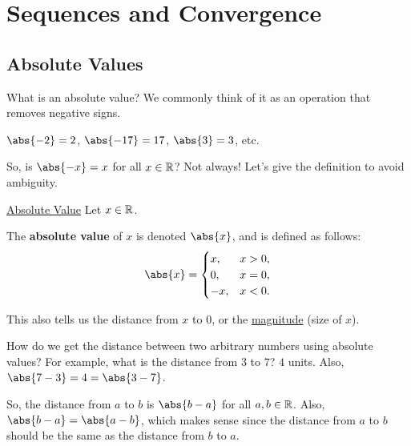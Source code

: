 \chapter{Sequences and Convergence}
\section{Absolute Values}
What is an absolute value? We commonly think of it as an operation that removes negative signs.
\begin{Example}{}{}
    $ \abs{-2}=2 $, $ \abs{-17}=17 $, $ \abs{3}=3 $, etc.
\end{Example}
So, is $ \abs{-x}=x $ for all $ x\in\mathbb{R}$? Not always! Let's give the definition to avoid ambiguity.
\begin{Definition}{\href{https://proofwiki.org/wiki/Definition:Absolute_Value/Definition_1}{Absolute Value}}{}
    Let $ x\in\mathbb{R} $.\bigskip

    The \textbf{absolute value} of $ x $ is denoted $ \abs{x} $,
    and is defined as follows:
    \[ \abs{x}=\begin{cases}
            x,  & x>0, \\
            0,  & x=0, \\
            -x, & x<0.
        \end{cases} \]
\end{Definition}
This also tells us the distance from $ x $ to $ 0 $, or the \underline{magnitude} (size of $ x $).
\begin{Example}{}{}
    How do we get the distance between two arbitrary numbers using absolute values? For example, what is
    the distance from $ 3 $ to $ 7 $? $ 4 $ units. Also, $ \abs{7-3}=4=\abs{3-7} $.
\end{Example}
So, the distance from $ a $ to $ b $ is $ \abs{b-a} $ for all $ a,b\in\mathbb{R} $. Also,
$ \abs{b-a}=\abs{a-b} $, which makes sense since the distance from $ a $ to $ b $ should be the same as
the distance from $ b $ to $ a $.
